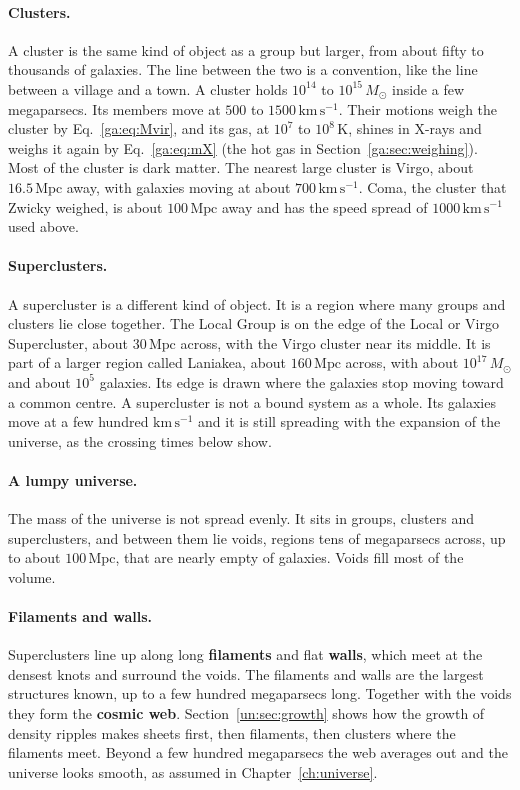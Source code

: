 \paragraph{Clusters.} A cluster is the same kind of object as a group but larger, from about fifty to thousands of galaxies. The line between the two is a convention, like the line between a village and a town. A cluster holds $10^{14}$ to $10^{15}\,M_\odot$ inside a few megaparsecs. Its members move at $500$ to $1500\,\mathrm{km\,s^{-1}}$. Their motions weigh the cluster by Eq.~\eqref{ga:eq:Mvir}, and its gas, at $10^7$ to $10^8\,\mathrm K$, shines in X-rays and weighs it again by Eq.~\eqref{ga:eq:mX} (the hot gas in Section~\ref{ga:sec:weighing}). Most of the cluster is dark matter. The nearest large cluster is Virgo, about $16.5\,\mathrm{Mpc}$ away, with galaxies moving at about $700\,\mathrm{km\,s^{-1}}$. Coma, the cluster that Zwicky weighed, is about $100\,\mathrm{Mpc}$ away and has the speed spread of $1000\,\mathrm{km\,s^{-1}}$ used above.

\paragraph{Superclusters.} A supercluster is a different kind of object. It is a region where many groups and clusters lie close together. The Local Group is on the edge of the Local or Virgo Supercluster, about $30\,\mathrm{Mpc}$ across, with the Virgo cluster near its middle. It is part of a larger region called Laniakea, about $160\,\mathrm{Mpc}$ across, with about $10^{17}\,M_\odot$ and about $10^5$ galaxies. Its edge is drawn where the galaxies stop moving toward a common centre. A supercluster is not a bound system as a whole. Its galaxies move at a few hundred $\mathrm{km\,s^{-1}}$ and it is still spreading with the expansion of the universe, as the crossing times below show.

\paragraph{A lumpy universe.} The mass of the universe is not spread evenly. It sits in groups, clusters and superclusters, and between them lie voids, regions tens of megaparsecs across, up to about $100\,\mathrm{Mpc}$, that are nearly empty of galaxies. Voids fill most of the volume.

\paragraph{Filaments and walls.} Superclusters line up along long \textbf{filaments} and flat \textbf{walls}, which meet at the densest knots and surround the voids. The filaments and walls are the largest structures known, up to a few hundred megaparsecs long. Together with the voids they form the \textbf{cosmic web}. Section~\ref{un:sec:growth} shows how the growth of density ripples makes sheets first, then filaments, then clusters where the filaments meet. Beyond a few hundred megaparsecs the web averages out and the universe looks smooth, as assumed in Chapter~\ref{ch:universe}.

